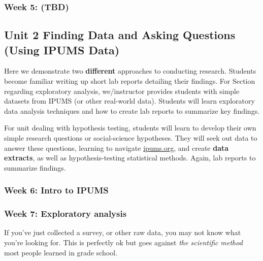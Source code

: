 \documentclass[
]{book}
\begin{document}
\hypertarget{week-5-tbd}{%
\subsubsection*{Week 5: (TBD)}\label{week-5-tbd}}

\hypertarget{unit-2-finding-data-and-asking-questions-using-ipums-data}{%
\subsection*{Unit 2 Finding Data and Asking Questions (Using IPUMS Data)}\label{unit-2-finding-data-and-asking-questions-using-ipums-data}}

Here we demonstrate two \textbf{different} approaches to conducting research. Students become familiar writing up short lab reports detailing their findings. For Section regarding exploratory analysis, we/instructor provides students with simple datasets from IPUMS (or other real-world data). Students will learn exploratory data analysis techniques and how to create lab reports to summarize key findings.

For unit dealing with hypothesis testing, students will learn to develop their own simple research questions or social-science hypotheses. They will seek out data to answer these questions, learning to navigate \href{https://ipums.org}{ipums.org}, and create \textbf{data extracts}, as well as hypothesis-testing statistical methods. Again, lab reports to summarize findings.

\hypertarget{week-6-intro-to-ipums}{%
\subsubsection{Week 6: Intro to IPUMS}\label{week-6-intro-to-ipums}}

\hypertarget{week-7-exploratory-analysis}{%
\subsubsection*{Week 7: Exploratory analysis}\label{week-7-exploratory-analysis}}

If you've just collected a survey, or other raw data, you may not know what you're looking for. This is perfectly ok but goes against \emph{the scientific method} most people learned in grade school.
\end{document}
